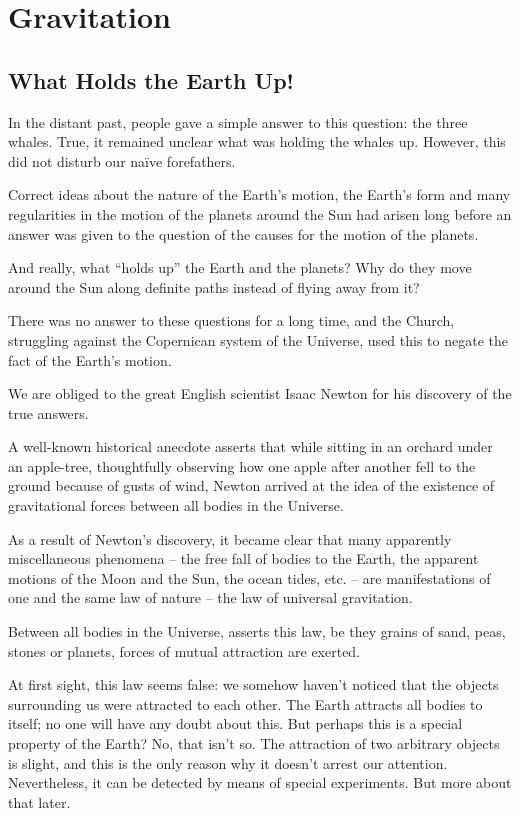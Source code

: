 

\cleardoublepage
\chapter{Gravitation}
\section{What Holds the Earth Up!}
In the distant past, people gave a simple answer to
this question: the three whales. True, it remained unclear
what was holding the whales up. However, this did not
disturb our na\"ive forefathers.

Correct ideas about the nature of the Earth's motion,
the Earth's form and many regularities in the motion of
the planets around the Sun had arisen long before an
answer was given to the question of the causes for the
motion of the planets.

And really, what ``holds up'' the Earth and the planets? Why do they move around the Sun along definite
paths instead of flying away from it?

There was no answer to these questions for a long time,
and the Church, struggling against the Copernican system of the Universe, used this to negate the fact of the
Earth's motion.

We are obliged to the great English scientist Isaac Newton for his discovery of the true answers.

A well-known historical anecdote asserts that while
sitting in an orchard under an apple-tree, thoughtfully
observing how one apple after another fell to the ground
because of gusts of wind, Newton arrived at the idea of
the existence of gravitational forces between all bodies
in the Universe.

As a result of Newton's discovery, it became clear that
many apparently miscellaneous phenomena -- the free
fall of bodies to the Earth, the apparent motions of the Moon and the Sun, the ocean tides, etc. -- are manifestations of one and the same law of nature -- the law of universal gravitation.

Between all bodies in the Universe, asserts this law,
be they grains of sand, peas, stones or planets, forces of
mutual attraction are exerted.

At first sight, this law seems false: we somehow haven't
noticed that the objects surrounding us were attracted to each other. The Earth attracts all bodies to itself;
no one will have any doubt about this. But perhaps this
is a special property of the Earth? No, that isn't so. The
attraction of two arbitrary objects is slight, and this is
the only reason why it doesn't arrest our attention. Nevertheless, it can be detected by means of special experiments. But more about that later.

